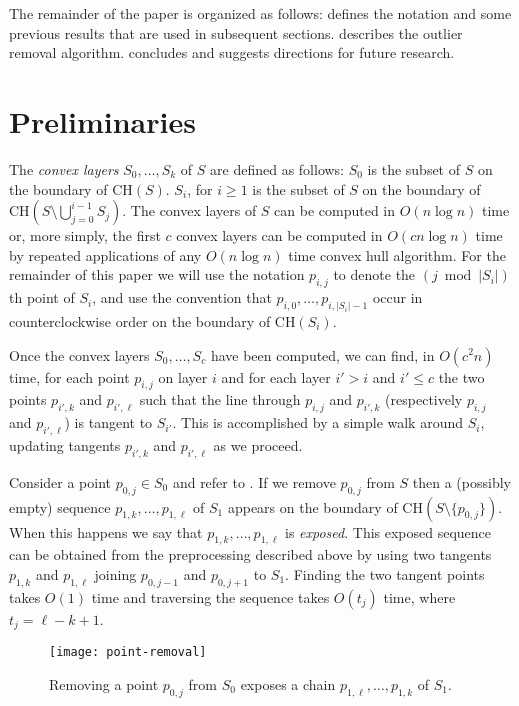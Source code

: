 \documentclass[lotsofwhite]{patmorin}
\newcommand{\ch}{\mathrm{CH}}
\begin{document}
The remainder of the paper is organized as follows:
 defines the notation and some previous results
that are used in subsequent sections.  describes the
outlier removal algorithm.  concludes and suggests
directions for future research.
 

\section{Preliminaries} 

The \emph{convex layers} $S_0,\ldots,S_k$ of $S$ are defined as
follows: $S_0$ is the subset of $S$ on the boundary of $\ch(S)$.
$S_i$, for $i\ge 1$ is the subset of $S$ on the boundary of
$\ch(S\setminus\bigcup_{j=0}^{i-1} S_j)$.  The convex layers of $S$
can be computed in $O(n\log n)$ time \cite{c85,hs92} or, more simply,
the first $c$ convex layers can be computed in $O(cn\log n)$ time by
repeated applications of any $O(n\log n)$ time convex hull algorithm.
For the remainder of this paper we will use the notation $p_{i,j}$ to
denote the $(j\bmod |S_i|)$th point of $S_i$, and use the convention
that $p_{i,0},\ldots,p_{i,|S_i|-1}$ occur in counterclockwise order on
the boundary of $\ch(S_i)$.

Once the convex layers $S_0,\ldots,S_c$ have been computed, we can
find, in $O(c^2 n)$ time, for each point $p_{i,j}$ on layer $i$ and
for each layer $i'> i$ and $i'\le c$ the two points $p_{i',k}$ and
$p_{i',\ell}$ such that the line through $p_{i,j}$ and $p_{i',k}$
(respectively $p_{i,j}$ and $p_{i',\ell}$) is tangent to $S_{i'}$.
This is accomplished by a simple walk around $S_i$, updating tangents
$p_{i',k}$ and $p_{i',\ell}$ as we proceed.

Consider a point $p_{0,j}\in S_0$ and refer to .
If we remove $p_{0,j}$ from $S$ then a (possibly empty) sequence
$p_{1,k},\ldots,p_{1,\ell}$ of $S_1$ appears on the boundary of
$\ch(S\setminus\{p_{0,j}\})$.  When this happens we say that
$p_{1,k},\ldots,p_{1,\ell}$ is \emph{exposed}.  This exposed sequence
can be obtained from the preprocessing described above by using two
tangents $p_{1,k}$ and $p_{1,\ell}$ joining $p_{0,j-1}$ and
$p_{0,j+1}$ to $S_1$.  Finding the two tangent points takes $O(1)$
time and traversing the sequence takes $O(t_j)$ time, where
$t_j=\ell-k+1$.

\begin{figure}
\begin{center}\texttt{[image: point-removal]}\end{center}
\caption{Removing a point $p_{0,j}$ from $S_0$ exposes a chain
$p_{1,\ell},\ldots,p_{1,k}$ of $S_1$.}
\end{figure}
\end{document}
